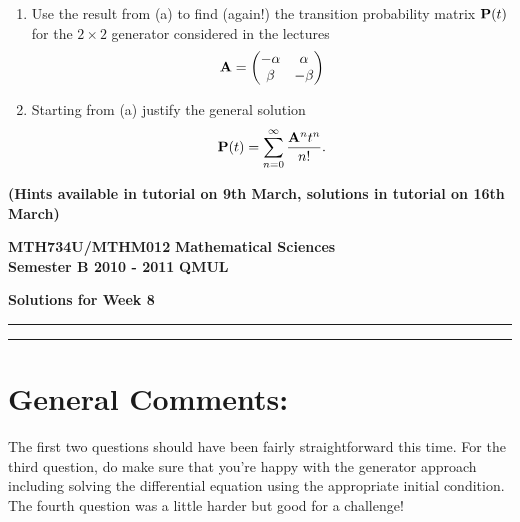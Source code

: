 \documentclass[11pt,a4paper]{article}
\begin{document}
\begin{enumerate}
\begin{enumerate}
      \item Use the result from (a) to find (again!) the transition probability matrix $\vb{P}(t)$ for the $2 \times 2$ generator considered in the lectures
      $$
      \vb{A} =
      \begin{pmatrix}
        -\alpha & \alpha\\
        \beta & -\beta
      \end{pmatrix}
      $$
      \item Starting from (a) justify the general solution
      $$
      \vb{P}(t) = \sum_{n = 0}^\infty \frac{\vb{A}^nt^n}{n!}.
      $$
    \end{enumerate}
    \textbf{(Hints available in tutorial on 9th March, solutions in tutorial on 16th March)}
  \end{enumerate}

  \newpage
  \textbf{MTH734U/MTHM012} \hfill \textbf{Mathematical Sciences}\\
  \textbf{Semester B 2010 - 2011} \hfill \textbf{QMUL}
  \begin{center}
    \textbf{\huge Solutions for Week 8}
  \end{center}
  \hrule \vspace{2mm} \hrule

  \section*{General Comments:}
  The first two questions should have been fairly straightforward this time. For the third question, do make sure that you're happy with the generator approach including solving the differential equation using the appropriate initial condition. The fourth question was a little harder but good for a challenge!
\end{document}
